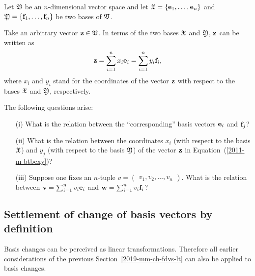 Let ${\frak V}$ be an $n$-dimensional vector space and let
${\frak X}
=
\{
{\bf e}_1,
\ldots ,
{\bf e}_n
\}$
and
${\frak Y}
=  \{
{\bf f}_1,
\ldots ,
{\bf f}_n
\}$ be two bases of ${\frak V}$.

Take an arbitrary vector ${\bf z}\in {\frak V}$.
In terms of the two bases
${\frak X}$ and
${\frak Y}$,
${\bf z}$ can be written as
\begin{equation}
{\bf z}=
\sum_{i=1}^n x_i{\bf e}_i
=
\sum_{i=1}^n  y_i{\bf f}_i,
\label{2011-m-btbexy}
\end{equation}
where $x_i$ and $y_i$ stand for the coordinates of the vector  ${\bf z}$
with respect to the bases ${\frak X}$ and
${\frak Y}$,
respectively.

The following questions arise:
\begin{itemize}
\item[(i)]
What is the relation between the ``corresponding'' basis vectors ${\bf e}_i$ and ${\bf f}_j$?
\item[(ii)]
What is the relation between the coordinates $x_i$ (with respect to the basis  ${\frak X}$) and $y_j$ (with respect to the basis  ${\frak Y}$)  of the vector ${\bf z}$ in Equation~(\ref{2011-m-btbexy})?
\item[(iii)]
Suppose one fixes
an $n$-tuple $v = \begin{pmatrix} v_1, v_2, \ldots , v_n \end{pmatrix}$.
What is the relation between
${\bf v} =
\sum_{i=1}^n v_i {\bf e}_i
$
and
${\bf w}=
\sum_{i=1}^n v_i {\bf f}_i
$?
\end{itemize}

\subsection{Settlement of change of basis vectors by definition}

Basis changes can be perceived as linear transformations.
Therefore all earlier considerations 
of the previous Section~\ref{2019-mm-ch-fdvs-lt} can also be applied to basis changes.


